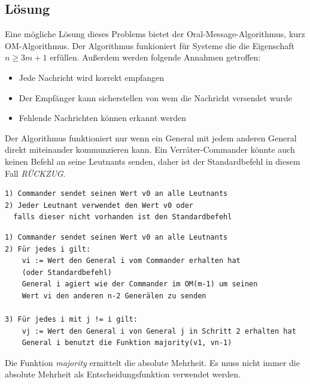 \documentclass{article}
\begin{document}
\subsection{Lösung}

Eine mögliche Lösung dieses Problems bietet der Oral-Message-Algorithmus, kurz OM-Algorithmus. Der
Algorithmus funkioniert für Systeme die die Eigenschaft $n \geq 3m + 1$ erfüllen. Außerdem werden 
folgende Annahmen getroffen: \\

\begin{itemize}
    \item Jede Nachricht wird korrekt empfangen 
    \item Der Empfänger kann sicherstellen von wem die Nachricht versendet wurde 
    \item Fehlende Nachrichten können erkannt werden
\end{itemize}

Der Algorithmus funktioniert nur wenn ein General mit jedem anderen General 
direkt miteinander kommunzieren kann. Ein Verräter-Commander könnte auch 
keinen Befehl an seine Leutnants senden, daher ist der Standardbefehl in diesem 
Fall \textit{RÜCKZUG}.

\begin{lstlisting}[caption=Algorithmus OM(0)]
1) Commander sendet seinen Wert v0 an alle Leutnants
2) Jeder Leutnant verwendet den Wert v0 oder 
  falls dieser nicht vorhanden ist den Standardbefehl
\end{lstlisting}

\medskip

\begin{lstlisting}[caption=Algorithmus OM(m) m > 0]
1) Commander sendet seinen Wert v0 an alle Leutnants
2) Für jedes i gilt:
    vi := Wert den General i vom Commander erhalten hat 
    (oder Standardbefehl)
    General i agiert wie der Commander im OM(m-1) um seinen 
    Wert vi den anderen n-2 Generälen zu senden

3) Für jedes i mit j != i gilt:
    vj := Wert den General i von General j in Schritt 2 erhalten hat
    General i benutzt die Funktion majority(v1, vn-1)
\end{lstlisting}

Die Funktion \textit{majority} ermittelt die absolute Mehrheit. 
Es muss nicht immer die absolute Mehrheit als Entscheidungsfunktion verwendet werden.
\end{document}
